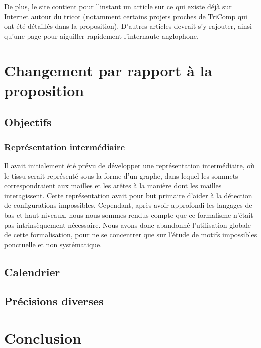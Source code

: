 \documentclass{article}
\begin{document}
De plus, le site contient pour l'instant un article sur ce qui existe déjà sur Internet autour du tricot (notamment certains projets 
proches de TriComp qui ont été détaillés dans la proposition). D'autres articles devrait s'y rajouter, ainsi qu'une page pour aiguiller 
rapidement l'internaute anglophone.

\section{Changement par rapport à la proposition}

\subsection{Objectifs}

\subsubsection{Représentation intermédiaire}

Il avait initialement été prévu de développer une représentation intermédiaire, où le tissu serait représenté sous la forme d'un graphe, 
dans lequel les sommets correspondraient aux mailles et les arêtes à la manière dont les mailles interagissent. Cette représentation avait 
pour but primaire d'aider à la détection de configurations impossibles. Cependant, après avoir approfondi les langages de bas et haut 
niveaux, nous nous sommes rendus compte que ce formalisme n'était pas intrinsèquement nécessaire. %
Nous avons donc abandonné l'utilisation globale de cette formalisation, pour ne se concentrer que sur l'étude de motifs impossibles 
ponctuelle et non systématique.

\subsection{Calendrier}

\subsection{Précisions diverses}

\section*{Conclusion}
\end{document}
